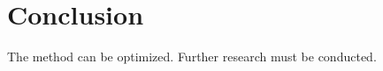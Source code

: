 \documentclass[runningheads]{llncs}
\begin{document}
\section{Conclusion}

The method can be optimized. Further research must be conducted.
%
%
%


%
\end{document}
